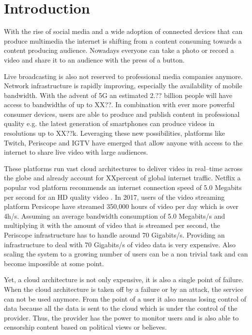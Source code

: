 \section{Introduction}
With the rise of social media and a wide adoption of connected devices that can produce multimedia the internet is shifting from a content consuming towards a content producing audience. Nowadays everyone can take a photo or record a video and share it to an audience with the press of a button. 

Live broadcasting is also not reserved to professional media companies anymore. Network infrastructure is rapidly improving, especially the availability of mobile bandwidth. With the advent of 5G an estimated 2.?? billion people will have access to bandwidths of up to XX??. In combination with ever more powerful consumer devices, users are able to produce and publish content in professional quality e.g. the latest generation of smartphones can produce videos in resolutions up to XX??k.
Leveraging these new possibilities, platforms like Twitch, Periscope and IGTV have emerged that allow anyone with access to the internet to share live video with large audiences.

These platforms run vast cloud architectures to deliver video in real–time across the globe and already account for XXpercent of global internet traffic.
Netflix a popular \gls{vod} platform recommends an internet connection speed of 5.0 Megabits per second for an HD quality video \cite{netflix-speed-recommendation}. In 2017, users of the video streaming platform Persicope have streamed 350,000 hours of video per day \cite{periscope-stats} which is over 4h/s. 
Assuming an average bandwidth consumption of 5.0 Megabits/s and multiplying it with the amount of video that is streamed per second, the Periscope infrastructure has to handle around 70 Gigabits/s.
Providing an infrastructure to deal with 70 Gigabits/s of video data is very expensive. Also scaling the system to a growing number of users can be a non trivial task and can become impossible at some point.

Yet, a cloud architecture is not only expensive, it is also a single point of failure. When the cloud architecture is taken off by a failure or by an attack, the service can not be used anymore.
From the point of a user it also means losing control of data because all the data is sent to the cloud which is under the control of the provider. Thus, the provider has the power to monitor users and is also able to censorship content based on political views or believes.

